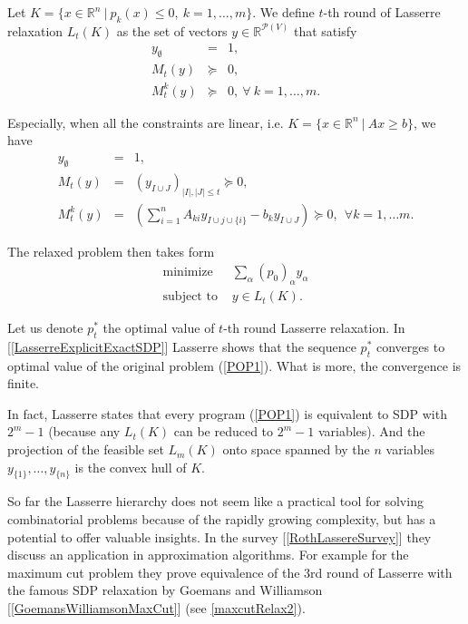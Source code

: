 \documentclass[12pt]{book}
\theoremstyle{definition}
\begin{document}
  Let $K = \{ x\in \mathbb{R}^n \ \vert \ p_k(x)\leq 0, \ k=1,\dots ,m \}$. We define $t$-th round of Lasserre relaxation $L_t(K)$ as the set of vectors $y\in \mathbb{R}^{\mathcal{P}(V)}$ that satisfy
\begin{equation}
\begin{array}{rcl}
y_\emptyset &=& 1, \\
M_t(y)  &\succeq & 0, \\
M_t^k(y)  &\succeq & 0 , \ \forall \ k=1,\dots ,m.
\end{array}
\end{equation}

Especially, when all the constraints are linear, i.e. $K = \{ x\in \mathbb{R}^n \ \vert \ Ax\geq b \}$, we have
\begin{equation}
\begin{array}{rcl}
y_\emptyset &=& 1,\\
M_t(y) &=& (y_{I\cup J})_{\vert I\vert ,\vert J\vert \leq t}\succeq 0,  \\
M_t^k(y) &=& \left(\sum_{i=1}^n A_{ki}y_{I\cup j\cup \{i\}} - b_ky_{I\cup J} \right) \succeq 0, \ \ \forall k=1,\dots m.
\end{array}
\end{equation}

The relaxed problem then takes form 
\begin{equation}
\label{LasserreRelax}
\begin{array}{ll}
\mbox{minimize } & \sum_\alpha (p_0)_\alpha y_\alpha \\
\mbox{subject to } & y\in L_t(K).
\end{array}
\end{equation}

Let us denote $p^*_t$ the optimal value of $t$-th round Lasserre relaxation. In [\ref{LasserreExplicitExactSDP}] Lasserre shows that the sequence $p^*_t$ converges to optimal value of the original problem (\ref{POP1}). 
What is more, the convergence is finite. %

In fact, Lasserre states that every program (\ref{POP1}) is equivalent to SDP  with $2^m-1$ (because any $L_t(K)$ can be reduced to $2^m-1$ variables). And the projection of the feasible set $L_m(K)$ onto space spanned by the $n$ variables $y_{\{1\}}, \dots ,y_{\{n\}}$ is the convex hull of $K$.

So far the Lasserre hierarchy does not seem like a practical tool for solving combinatorial problems because of the rapidly growing complexity, but has a potential to offer valuable insights. In the survey [\ref{RothLassereSurvey}] they discuss an application in approximation algorithms. For example for the maximum cut problem they prove equivalence of the 3rd round of Lasserre with the famous SDP relaxation by Goemans and Williamson [\ref{GoemansWilliamsonMaxCut}] (see \ref{maxcutRelax2}).
\end{document}
